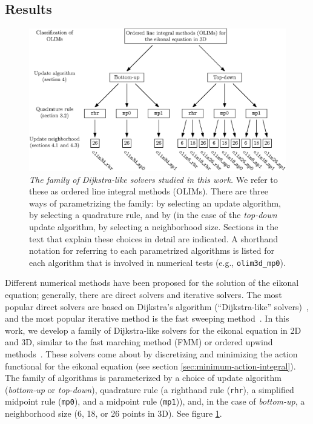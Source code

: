 \documentclass[smallcondensed]{svjour3}
\begin{document}
\subsection{Results}

\begin{figure}
  \centering
  \includegraphics[width=\linewidth]{classification.eps}
  \caption{
    \emph{The family of Dijkstra-like solvers studied in this work.}
    We refer to these as ordered line integral methods (OLIMs).  There
    are three ways of parametrizing the family: by selecting an update
    algorithm, by selecting a quadrature rule, and by (in the case of
    the \emph{top-down} update algorithm, by selecting a neighborhood
    size. Sections in the text that explain these choices in detail
    are indicated. A shorthand notation for referring to each
    parametrized algorithms is listed for each algorithm that is
    involved in numerical tests (e.g., \texttt{olim3d\_mp0}).
  }\label{fig:classification}
\end{figure}

Different numerical methods have been proposed for the solution of the
eikonal equation; generally, there are direct solvers and iterative
solvers. The most popular direct solvers are based on Dijkstra's
algorithm (``Dijkstra-like''
solvers)~\cite{tsitsiklis1995efficient,sethian1996fast}, and the most
popular iterative method is the fast sweeping
method~\cite{tsai2003fast,zhao2005fast}. In this work, we develop a
family of Dijkstra-like solvers for the eikonal equation in 2D and 3D,
similar to the fast marching method (FMM) or ordered upwind
methods~\cite{sethian1996fast,sethian2003ordered}. These solvers come
about by discretizing and minimizing the action functional for the
eikonal equation (see section\@
\ref{sec:minimum-action-integral}). The family of algorithms is
parameterized by a choice of update algorithm (\emph{bottom-up} or
\emph{top-down}), quadrature rule (a righthand rule (\texttt{rhr}), a
simplified midpoint rule (\texttt{mp0}), and a midpoint rule
(\texttt{mp1})), and, in the case of \emph{bottom-up}, a neighborhood
size (6, 18, or 26 points in 3D). See figure
\ref{fig:classification}.
\end{document}
